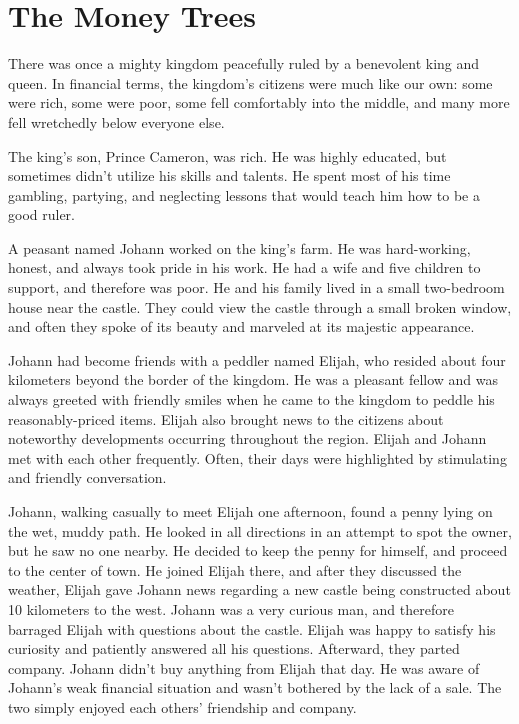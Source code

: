\chapter{The Money Trees}

There was once a mighty kingdom peacefully ruled by a benevolent king and queen. In financial terms, the kingdom's citizens were much like our own: some were rich, some were poor, some fell comfortably into the middle, and many more fell wretchedly below everyone else.

The king's son, Prince Cameron, was rich. He was highly educated, but sometimes didn't utilize his skills and talents. He spent most of his time gambling, partying, and neglecting lessons that would teach him how to be a good ruler.

A peasant named Johann worked on the king's farm. He was hard-working, honest, and always took pride in his work. He had a wife and five children to support, and therefore was poor. He and his family lived in a small two-bedroom house near the castle. They could view the castle through a small broken window, and often they spoke of its beauty and  marveled at its majestic appearance.

Johann had become friends with a peddler named Elijah, who resided about four kilometers beyond the border of the kingdom. He was a pleasant fellow and was always greeted with friendly smiles when he came to the kingdom to peddle his reasonably-priced items. Elijah also brought news to the citizens about noteworthy developments occurring throughout the region. Elijah and Johann met with each other frequently. Often, their days were highlighted by stimulating and friendly conversation.

Johann, walking casually to meet Elijah one afternoon, found a penny lying on the wet, muddy path. He looked in all directions in an attempt to  spot the owner, but he saw no one nearby. He decided to keep the penny for himself, and proceed to the center of town. He joined Elijah there, and after they discussed the weather, Elijah gave Johann news regarding a new castle being constructed about 10 kilometers to the west. Johann was a very curious man, and therefore barraged Elijah with questions about the castle. Elijah was happy to satisfy his curiosity and patiently answered all his questions. Afterward, they parted company. Johann didn't buy anything from Elijah that day. He was aware of Johann's weak financial situation and wasn't bothered by the lack of a sale. The two simply enjoyed each others' friendship and company.


